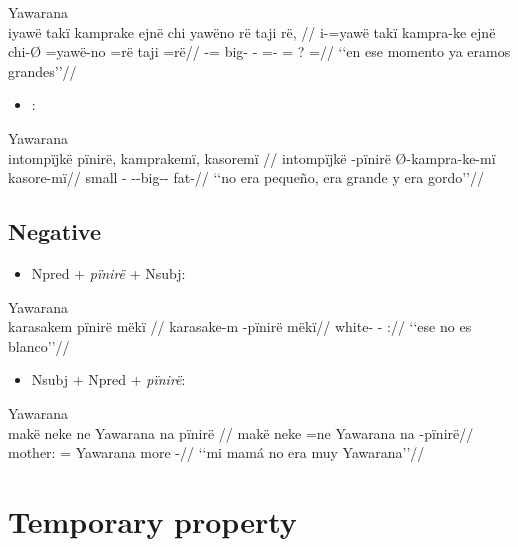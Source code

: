 \documentclass{memoir}
\begin{document}
\ex Yawarana \\
\label{convcosnoind-116}    \begingl
    \glpreamble iyawë takï kamprake ejnë chi yawëno rë taji rë, //
    \gla i-=yawë takï kampra-ke ejnë chi-Ø =yawë-no =rë taji =rë//
    \glb {}-=  big-  - =- = ? =//
        \glft ‘‘en ese momento ya eramos grandes’’//  
    \endgl 
\xe

\begin{itemize}
\tightlist
\item
  :
\end{itemize}

\ex Yawarana \\
\label{conv1stenc-80}    \begingl
    \glpreamble intompïjkë pïnirë, kamprakemï, kasoremï //
    \gla intompïjkë -pïnirë Ø-kampra-ke-mï kasore-mï//
    \glb small - --big-- fat-//
        \glft ‘‘no era pequeño, era grande y era gordo’’//  
    \endgl 
\xe

\subsection{Negative}

\begin{itemize}
\tightlist
\item
  Npred + \emph{pïnirë} + Nsubj:
\end{itemize}

\ex Yawarana \\
\label{ctovarmafl-64}    \begingl
    \glpreamble karasakem pïnirë mëkï //
    \gla karasake-m -pïnirë mëkï//
    \glb white- - ://
        \glft ‘‘ese no es blanco’’//  
    \endgl 
\xe

\begin{itemize}
\tightlist
\item
  Nsubj + Npred + \emph{pïnirë}:
\end{itemize}

\ex Yawarana \\
\label{descmensgrme-67}    \begingl
    \glpreamble makë neke ne Yawarana na pïnirë //
    \gla makë neke =ne Yawarana na -pïnirë//
    \glb mother:  = Yawarana more -//
        \glft ‘‘mi mamá no era muy Yawarana’’//  
    \endgl 
\xe

\section{Temporary property}
\end{document}
